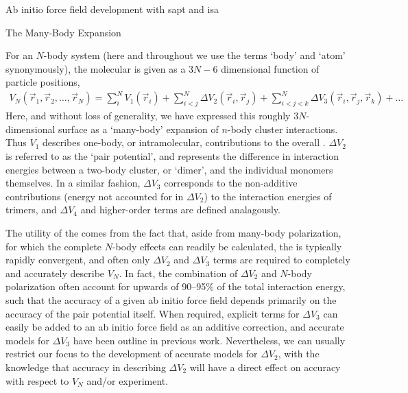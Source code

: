 \begin{section}{Ab initio force field development with \acrshort{sapt} and
\acrshort{isa}}
\begin{subsection}{The Many-Body Expansion}
\label{sec:intro-mbe}


For an $N$-body system (here and throughout we use the terms `body' and `atom'
synonymously), the molecular \pes is given as a $3N-6$ 
dimensional function of particle positions,
\cite{Stone2007,Cieplak2009,McDaniel2014,Elrodt1997}
%
\begin{align}
V_N(\vec r_1 ,\vec r_2 ,\dots,\vec r_N ) =
    \sum\limits_{i}^{N} V_1(\vec r_i) +
    \sum\limits_{i < j}^{N} \Delta V_2(\vec r_i, \vec r_j) +
    \sum\limits_{i < j < k}^{N} \Delta V_3(\vec r_i, \vec r_j, \vec r_k) +
\dots
\end{align}
%
Here, and without loss of generality, we have expressed this roughly $3N$-dimensional
surface as a `many-body' expansion of $n$-body cluster interactions.
Thus $V_1$ describes one-body, or intramolecular, contributions to the overall
\pes. $\Delta V_2$ is referred to as the `pair potential', and represents the
difference in interaction energies between a two-body cluster, or `dimer', and the
individual monomers themselves. In a similar fashion,
$\Delta V_3$ corresponds to
the non-additive contributions (energy not accounted for
in $\Delta V_2$) to the interaction energies of trimers, and $\Delta V_4$ and
higher-order terms are defined analagously. 

The utility of the \mbe comes from the fact that, aside from 
many-body polarization, for which the complete $N$-body effects can readily be
calculated,\cite{Stone2007,Rick2002} the \mbe is typically
rapidly convergent, and often only $\Delta V_2$ and
 $\Delta V_3$ terms are required to completely and accurately describe
$V_N$.\cite{Stone2007,stone2013theory} In fact, the combination of $\Delta
V_2$ and $N$-body polarization often account for
upwards of 90--95\%
of the total interaction energy,
\cite{McDaniel2014,stone2013theory}
such that the accuracy of a given ab initio force field depends primarily on
the accuracy of the pair potential itself. 
When
required, explicit terms for 
$\Delta V_3$ can easily be added to an ab initio force field as an additive
correction, and accurate models for  $\Delta V_3$ have been outline in
previous work.
\cite{McDaniel2014}
Nevertheless,
we can usually restrict our focus to the development of accurate models for $\Delta
V_2$, with the knowledge that accuracy in describing $\Delta V_2$ will have a
direct effect on accuracy with respect to $V_N$ and/or experiment. 



\end{subsection}
\end{section}
